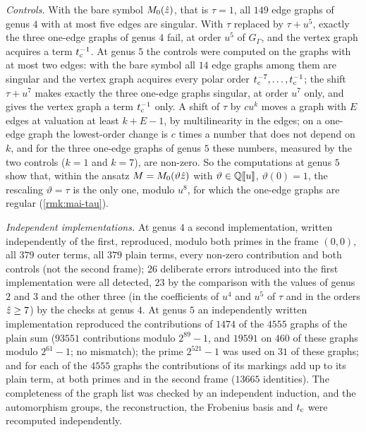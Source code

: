 \emph{Controls.} With the bare symbol $M_{0}(\hat{z})$, that is $\tau=1$, all $149$ edge graphs of genus $4$ with at most five edges are singular. With $\tau$ replaced by $\tau+u^5$, exactly the three one-edge graphs of genus $4$ fail, at order $u^5$ of $G_\Gamma$, and the vertex graph acquires a term $t_{\mathrm{c}}^{-1}$. At genus $5$ the controls were computed on the graphs with at most two edges: with the bare symbol all $14$ edge graphs among them are singular and the vertex graph acquires every polar order $t_{\mathrm{c}}^{-7},\dots,t_{\mathrm{c}}^{-1}$; the shift $\tau+u^7$ makes exactly the three one-edge graphs singular, at order $u^7$ only, and gives the vertex graph a term $t_{\mathrm{c}}^{-1}$ only. A shift of $\tau$ by $cu^k$ moves a graph with $E$ edges at valuation at least $k+E-1$, by multilinearity in the edges; on a one-edge graph the lowest-order change is $c$ times a number that does not depend on $k$, and for the three one-edge graphs of genus $5$ these numbers, measured by the two controls ($k=1$ and $k=7$), are non-zero. So the computations at genus $5$ show that, within the ansatz $M=M_{0}(\vartheta\hat{z})$ with $\vartheta\in\mathbb{Q}[\![ u ]\!]$, $\vartheta(0)=1$, the rescaling $\vartheta=\tau$ is the only one, modulo $u^8$, for which the one-edge graphs are regular (\cref{rmk:mai-tau}).

\emph{Independent implementations.} At genus $4$ a second implementation, written independently of the first, reproduced, modulo both primes in the frame $(0,0)$, all $379$ outer terms, all $379$ plain terms, every non-zero contribution and both controls (not the second frame); $26$ deliberate errors introduced into the first implementation were all detected, $23$ by the comparison with the values of genus $2$ and $3$ and the other three (in the coefficients of $u^4$ and $u^5$ of $\tau$ and in the orders $\hat{z}\geq7$) by the checks at genus $4$. At genus $5$ an independently written implementation reproduced the contributions of $1474$ of the $4555$ graphs of the plain sum ($93551$ contributions modulo $2^{89}-1$, and $19591$ on $460$ of these graphs modulo $2^{61}-1$; no mismatch); the prime $2^{521}-1$ was used on $31$ of these graphs; and for each of the $4555$ graphs the contributions of its markings add up to its plain term, at both primes and in the second frame ($13665$ identities). The completeness of the graph list was checked by an independent induction, and the automorphism groups, the reconstruction, the Frobenius basis and $t_{\mathrm{c}}$ were recomputed independently.


